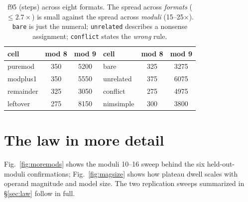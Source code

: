 \documentclass{article} %
\begin{document}
\begin{table}[h]
\centering
\small
\begin{tabular}{lcc|lcc}
\toprule
cell & mod 8 & mod 9 & cell & mod 8 & mod 9 \\
\midrule
puremod    & 350 & 5200 & bare       & 325 & 3275 \\
modplus1   & 350 & 5550 & unrelated  & 375 & 6075 \\
remainder  & 325 & 3050 & conflict   & 275 & 4975 \\
leftover   & 275 & 8150 & nimsimple  & 300 & 3800 \\
\bottomrule
\end{tabular}
\caption{f95 (steps) across eight formats. The spread across \emph{formats} ($\le 2.7\times$) is small against the spread across \emph{moduli} (15--25$\times$). \texttt{bare} is just the numeral; \texttt{unrelated} describes a nonsense assignment; \texttt{conflict} states the \emph{wrong} rule.}
\label{tab:formats}
\end{table}

\section{The law in more detail}
\label{app:lawfigs}

Fig.~\ref{fig:moremods} shows the moduli 10--16 sweep behind the six held-out-moduli confirmations; Fig.~\ref{fig:magsize} shows how plateau dwell scales with operand magnitude and model size. The two replication sweeps summarized in \S\ref{sec:law} follow in full.
\end{document}

